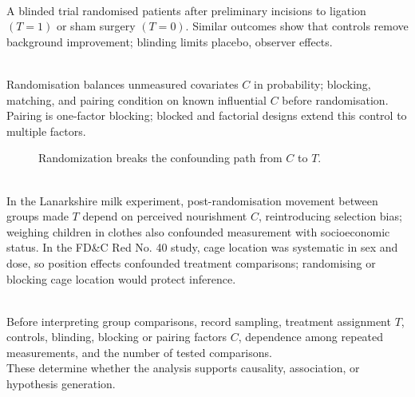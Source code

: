 \begin{example} \label{ex:mammary-artery-ligation-design} \\
A blinded trial randomised patients after preliminary incisions to ligation $(T=1)$ or sham surgery $(T=0)$. Similar outcomes show that controls remove background improvement; blinding limits placebo, observer effects.
\end{example}

\begin{principle} \label{prin:randomization-confounding-and-blocking} \\
Randomisation balances unmeasured covariates $C$ in probability; blocking, matching, and pairing condition on known influential $C$ before randomisation. Pairing is one-factor blocking; blocked and factorial designs extend this control to multiple factors.
\end{principle}

\begin{figure}[H]
  \centering
  
  \caption{Randomization breaks the confounding path from $C$ to $T$.}
  \label{fig:randomization-confounding-paths}
\end{figure}

\begin{example} \label{ex:lanarkshire-and-cage-position-design} \\
In the Lanarkshire milk experiment, post-randomisation movement between groups made $T$ depend on perceived nourishment $C$, reintroducing selection bias; weighing children in clothes also confounded measurement with socioeconomic status. In the FD\&C Red No. 40 study, cage location was systematic in sex and dose, so position effects confounded treatment comparisons; randomising or blocking cage location would protect inference.
\end{example}

\begin{remark} \label{rem:comparative-study-checklist} \\
Before interpreting group comparisons, record sampling, treatment assignment $T$, controls, blinding, blocking or pairing factors $C$, dependence among repeated measurements, and the number of tested comparisons.\\
These determine whether the analysis supports causality, association, or hypothesis generation.
\end{remark}
